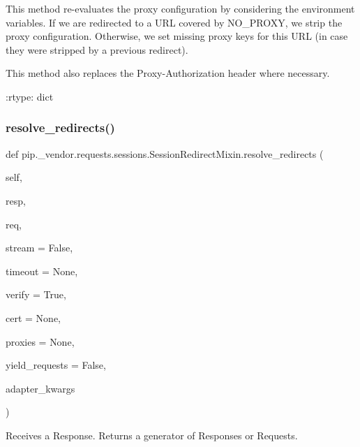 \begin{DoxyVerb}This method re-evaluates the proxy configuration by considering the
environment variables. If we are redirected to a URL covered by
NO_PROXY, we strip the proxy configuration. Otherwise, we set missing
proxy keys for this URL (in case they were stripped by a previous
redirect).

This method also replaces the Proxy-Authorization header where
necessary.

:rtype: dict
\end{DoxyVerb}
 \mbox{\label{classpip_1_1__vendor_1_1requests_1_1sessions_1_1SessionRedirectMixin_a313de3c5e20d7dc2fa505cd54eae94f4}} 
\subsubsection{\texorpdfstring{resolve\+\_\+redirects()}{resolve\_redirects()}}
{\footnotesize\ttfamily def pip.\+\_\+vendor.\+requests.\+sessions.\+Session\+Redirect\+Mixin.\+resolve\+\_\+redirects (\begin{DoxyParamCaption}\item[{}]{self,  }\item[{}]{resp,  }\item[{}]{req,  }\item[{}]{stream = {\ttfamily False},  }\item[{}]{timeout = {\ttfamily None},  }\item[{}]{verify = {\ttfamily True},  }\item[{}]{cert = {\ttfamily None},  }\item[{}]{proxies = {\ttfamily None},  }\item[{}]{yield\+\_\+requests = {\ttfamily False},  }\item[{}]{adapter\+\_\+kwargs }\end{DoxyParamCaption})}

\begin{DoxyVerb}Receives a Response. Returns a generator of Responses or Requests.\end{DoxyVerb}
 \mbox{\label{classpip_1_1__vendor_1_1requests_1_1sessions_1_1SessionRedirectMixin_af96b42ec7e6b8c835c10691462048866}} 
